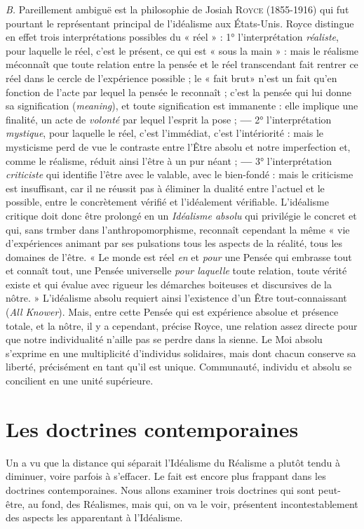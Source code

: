 {\it B.} Pareillement ambiguë est la philosophie de Josiah \textsc{Royce} (1855-1916)
qui fut pourtant le représentant principal de l’idéalisme aux États-Unis.
Royce distingue en effet trois interprétations possibles du « réel » : 1°
l’interprétation {\it réaliste}, pour laquelle le réel, c’est le présent, ce qui est « sous
la main » : mais le réalisme méconnaît que toute relation entre la pensée
et le réel transcendant fait rentrer ce réel dans le cercle de l'expérience
possible ; le « fait brut» n’est un fait qu’en fonction de l'acte par lequel
la pensée le reconnaît ; c’est la pensée qui lui donne sa signification ({\it meaning}),
et toute signification est immanente : elle implique une finalité,
un acte de {\it volonté} par lequel l'esprit la pose ; {\bf —} 2° l'interprétation {\it mystique},
pour laquelle le réel, c’est l'immédiat, c’est l’intériorité : mais le mysticisme
perd de vue le contraste entre l’Être absolu et notre imperfection et, comme
le réalisme, réduit ainsi l’être à un pur néant ; {\bf —} 3° l'interprétation {\it criticiste}
qui identifie l'être avec le valable, avec le bien-fondé : mais le criticisme
est insuffisant, car il ne réussit pas à éliminer la dualité entre l’actuel et le
possible, entre le concrètement vérifié et l’idéalement vérifiable. L'idéalisme
critique doit donc être prolongé en un \textsf{\textit {Idéalisme absolu}} qui privilégie le
concret et qui, sans trmber dans l’anthropomorphisme, reconnaît cependant
la même « vie d'expériences animant par ses pulsations tous les aspects de
la réalité, tous les domaines de l'être. « Le monde est réel {\it en} et {\it pour} une
Pensée qui embrasse tout et connaît tout, une Pensée universelle {\it pour
laquelle} toute relation, toute vérité existe et qui évalue avec rigueur les
démarches boiteuses et discursives de la nôtre. » L’idéalisme absolu requiert
ainsi l’existence d’un Être tout-connaissant ({\it All Knower}). Mais, entre cette
Pensée qui est expérience absolue et présence totale, et la nôtre, il y a
cependant, précise Royce, une relation assez directe pour que notre individualité
n’aille pas se perdre dans la sienne. Le Moi absolu s'exprime en une
multiplicité d'individus solidaires, mais dont chacun conserve sa liberté,
précisément en tant qu'il est unique. Communauté, individu et absolu se
concilient en une unité supérieure.

\section{Les doctrines contemporaines}%
Un a vu que la distance
qui séparait l’Idéalisme du Réalisme a plutôt tendu à diminuer, voire
parfois à s’effacer. Le fait est encore plus frappant dans les doctrines
contemporaines. Nous allons examiner trois doctrines qui sont peut-être,
au fond, des Réalismes, mais qui, on va le voir, présentent incontestablement
des aspects les apparentant à l’Idéalisme.

